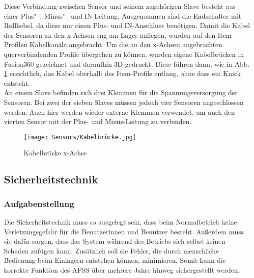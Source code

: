 Diese Verbindung zwischen Sensor und seinem zugehörigen Slave besteht aus einer Plus"~, Minus"~ und IN-Leitung. Ausgenommen sind die Endschalter mit Rollhebel, da diese nur einen Plus- und IN-Anschluss benötigen. Damit die Kabel der Sensoren an den x-Achsen eng am Lager anliegen, wurden auf den Item-Profilen Kabelkanäle angebracht. Um die an den x-Achsen angebrachten querverbindenden Profile übergehen zu können, wurden eigene Kabelbrücken in Fusion360 gezeichnet und daraufhin 3D-gedruckt. Diese führen dann, wie in Abb. \ref{Kabelbrücke} ersichtlich, das Kabel oberhalb des Item-Profils entlang, ohne dass ein Knick entsteht.\\
An einem Slave befinden sich drei Klemmen für die Spannungsversorgung der Sensoren. Bei zwei der sieben Slaves müssen jedoch vier Sensoren angeschlossen werden. Auch hier werden wieder externe Klemmen verwendet, um auch den vierten Sensor mit der Plus- und Minus-Leitung zu verbinden.

\begin{figure}[H]
    \centering
    \texttt{[image: Sensors/Kabelbrücke.jpg]}
    \caption{Kabelbrücke x-Achse}
    \label{Kabelbrücke}
\end{figure}

\subsection{Sicherheitstechnik}
\subsubsection{Aufgabenstellung}
Die Sicherheitstechnik muss so ausgelegt sein, dass beim Normalbetrieb keine Verletzungsgefahr für die Benutzerinnen und Benutzer besteht. Außerdem muss sie dafür sorgen, dass das System während des Betriebs sich selbst keinen Schaden zufügen kann. Zusätzlich soll sie Fehler, die durch menschliche Bedienung beim Einlagern entstehen können, minimieren. Somit kann die korrekte Funktion des AFSS über mehrere Jahre hinweg sichergestellt werden.

